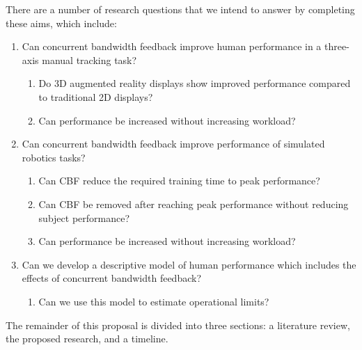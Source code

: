 \documentclass[float=false, crop=false]{standalone}
\begin{document}
There are a number of research questions that we intend to answer by completing these aims, which include:
\begin{enumerate}
\item Can concurrent bandwidth feedback improve human performance in a three-axis manual tracking task?
\begin{enumerate}
\item Do 3D augmented reality displays show improved performance compared to traditional 2D displays?
\item Can performance be increased without increasing workload?
\end{enumerate}
\item Can concurrent bandwidth feedback improve performance of simulated robotics tasks?
\begin{enumerate}
\item Can CBF reduce the required training time to peak performance?
\item Can CBF be removed after reaching peak performance without reducing subject performance?
\item Can performance be increased without increasing workload?
\end{enumerate}
\item Can we develop a descriptive model of human performance which includes the effects of concurrent bandwidth feedback?
\begin{enumerate}
\item Can we use this model to estimate operational limits?
\end{enumerate}
\end{enumerate}

The remainder of this proposal is divided into three sections: a literature review, the proposed research, and a timeline.
\end{document}
